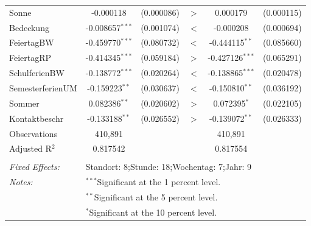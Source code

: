 \documentclass[a4paper,12pt]{thesis}
\begin{document}
\begin{table}[!htbp]
\begin{tabular}{@{\extracolsep{-5pt}}lccccc}
		Sonne & -0.000118 & (0.000086) & $>$ & 0.000179 & (0.000115)\\ 
		
		Bedeckung & -0.008657$^{***}$ & (0.001074) & $<$ & -0.000208 & (0.000694)\\ 
		
		FeiertagBW & -0.459770$^{***}$ & (0.080732) & $<$ & -0.444115$^{**}$ & (0.085660)\\ 
		
		FeiertagRP & -0.414345$^{***}$ & (0.059184) & $>$ & -0.427126$^{***}$ & (0.065291)\\ 
		
		SchulferienBW & -0.138772$^{***}$ & (0.020264) & $<$ & -0.138865$^{***}$ & (0.020478)\\ 
		
		SemesterferienUM & -0.159223$^{**}$ & (0.030637) & $<$ & -0.150810$^{**}$ & (0.036192)\\ 
		
		Sommer & 0.082386$^{**}$ & (0.020602) & $>$ & 0.072395$^{*}$ & (0.022105)\\ 
		
		Kontaktbeschr & -0.133188$^{**}$ & (0.026552) & $>$ & -0.139072$^{**}$ & (0.026333)\\ 
		
		Observations & 410,891 & & & 410,891 & \\ 
		Adjusted R$^{2}$ & 0.817542 & & & 0.817554 & \\  
		\hline \\[-1.8ex] 
		\textit{Fixed Effects:} & \multicolumn{5}{l}{Standort: 8;Stunde: 18;Wochentag: 7;Jahr: 9} \\ 
		\textit{Notes:} & \multicolumn{5}{l}{$^{***}$Significant at the 1 percent level.} \\ 
		& \multicolumn{5}{l}{$^{**}$Significant at the 5 percent level.} \\ 
		& \multicolumn{5}{l}{$^{*}$Significant at the 10 percent level.} \\ 
	\end{tabular} 
\end{table} 
\end{document}

